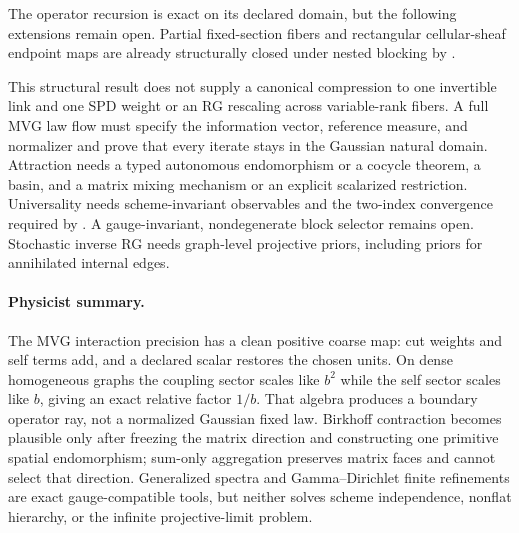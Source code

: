 The operator recursion is exact on its declared domain, but the following
extensions remain open.  Partial fixed-section fibers and rectangular
cellular-sheaf endpoint maps are already structurally closed under nested
blocking by .

This structural result does not supply a canonical
compression to one invertible link and one SPD weight or an RG rescaling
across variable-rank fibers.  A full MVG law flow must specify the information
vector, reference measure, and normalizer and prove that every iterate stays
in the Gaussian natural domain.  Attraction needs a typed autonomous
endomorphism or a cocycle theorem, a basin, and a matrix mixing mechanism or
an explicit scalarized restriction.  Universality needs scheme-invariant
observables and the two-index convergence required by
.  A gauge-invariant, nondegenerate block
selector remains open.  Stochastic inverse RG needs graph-level projective
priors, including priors for annihilated internal edges. 

\paragraph{Physicist summary.}
The MVG interaction precision has a clean positive coarse map:
cut weights and self terms add, and a declared scalar restores the chosen
units.  On dense homogeneous graphs the coupling sector scales like \(b^2\)
while the self sector scales like \(b\), giving an exact relative factor
\(1/b\).  That algebra produces a boundary operator ray, not a normalized
Gaussian fixed law.  Birkhoff contraction becomes plausible only after
freezing the matrix direction and constructing one primitive spatial
endomorphism; sum-only aggregation preserves matrix faces and cannot select
that direction.  Generalized spectra and Gamma--Dirichlet finite refinements
are exact gauge-compatible tools, but neither solves scheme independence,
nonflat hierarchy, or the infinite projective-limit problem.
